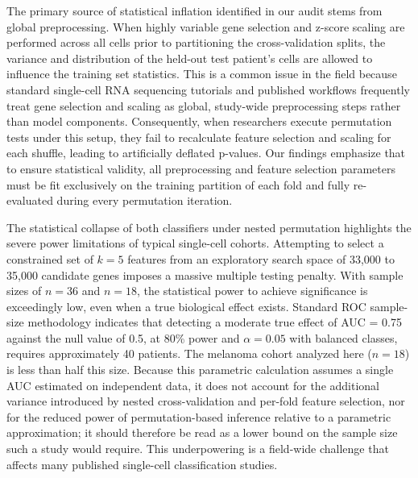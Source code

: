\documentclass{bmcart}
\begin{document}
The primary source of statistical inflation identified in our audit stems from global preprocessing. When highly variable gene selection and z-score scaling are performed across all cells prior to partitioning the cross-validation splits, the variance and distribution of the held-out test patient's cells are allowed to influence the training set statistics. This is a common issue in the field because standard single-cell RNA sequencing tutorials and published workflows frequently treat gene selection and scaling as global, study-wide preprocessing steps rather than model components. Consequently, when researchers execute permutation tests under this setup, they fail to recalculate feature selection and scaling for each shuffle, leading to artificially deflated p-values. Our findings emphasize that to ensure statistical validity, all preprocessing and feature selection parameters must be fit exclusively on the training partition of each fold and fully re-evaluated during every permutation iteration.

The statistical collapse of both classifiers under nested permutation highlights the severe power limitations of typical single-cell cohorts. Attempting to select a constrained set of $k=5$ features from an exploratory search space of 33,000 to 35,000 candidate genes imposes a massive multiple testing penalty. With sample sizes of $n=36$ and $n=18$, the statistical power to achieve significance is exceedingly low, even when a true biological effect exists. Standard ROC sample-size methodology \cite{hanley} indicates that detecting a moderate true effect of AUC = 0.75 against the null value of 0.5, at 80\% power and $\alpha = 0.05$ with balanced classes, requires approximately 40 patients. The melanoma cohort analyzed here ($n = 18$) is less than half this size. Because this parametric calculation assumes a single AUC estimated on independent data, it does not account for the additional variance introduced by nested cross-validation and per-fold feature selection, nor for the reduced power of permutation-based inference relative to a parametric approximation; it should therefore be read as a lower bound on the sample size such a study would require. This underpowering is a field-wide challenge that affects many published single-cell classification studies.
\end{document}
